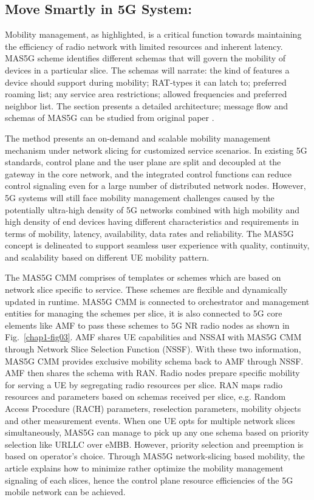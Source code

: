 \begin{multicols}{2}
\begin{itemize}
\end{itemize}

\subsection{Move Smartly in 5G System:} 

Mobility management, as highlighted, is a critical function towards maintaining the efficiency of radio network with limited resources and inherent latency. MAS5G scheme identifies different schemas that will govern the mobility of devices in a particular slice. The schemas will narrate: the kind of features a device should support during mobility; RAT-types it can latch to; preferred roaming list; any service area restrictions; allowed frequencies  and preferred neighbor list. The section presents a detailed architecture; message flow and schemas of MAS5G can be studied from original paper \cite{art1-key01}.

The method presents an on-demand and scalable mobility management mechanism under network slicing for customized service scenarios. In existing 5G standards, control plane and the user plane are split and decoupled at the gateway in the core network, and the integrated control functions can reduce control signaling even for a large number of distributed network nodes. However, 5G systems will still face mobility management challenges caused by the potentially ultra-high density of 5G networks combined with high mobility and high density of end devices having different characteristics and requirements in terms of mobility, latency, availability, data rates and reliability. The MAS5G concept is delineated to support seamless user experience with quality, continuity, and scalability based on different UE mobility pattern.

The MAS5G CMM comprises of templates or schemes which are based on network slice specific to service. These schemes are flexible and dynamically updated in runtime. MAS5G CMM is connected to orchestrator and management entities for managing the schemes per slice, it is also connected to 5G core elements like AMF to pass these schemes to 5G NR radio nodes as shown in Fig.~\ref{chap1-fig03}. AMF shares UE capabilities and NSSAI with MAS5G CMM through Network Slice Selection Function (NSSF). With these two information, MAS5G CMM provides exclusive mobility schema back to AMF through NSSF. AMF then shares the schema with RAN. Radio nodes prepare specific mobility for serving a UE by segregating radio resources per slice. RAN maps radio resources and parameters based on schemas received per slice, e.g. Random Access Procedure (RACH) parameters, reselection parameters, mobility objects and other measurement events. When one UE opts for multiple network slices simultaneously, MAS5G can manage to pick up any one schema based on priority selection like URLLC over eMBB. However, priority selection and preemption is based on operator’s choice. Through MAS5G network-slicing based mobility, the article explains how to minimize rather optimize the mobility management signaling of each slices, hence the control plane resource efficiencies of the 5G mobile network can be achieved. 


\end{multicols}

